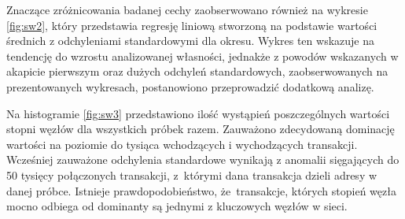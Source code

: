 \documentclass[12pt, twoside, final, openany]{mgr}
\begin{document}
\indent Znaczące zróżnicowania badanej cechy zaobserwowano również na wykresie \ref{fig:sw2}, który przedstawia regresję liniową stworzoną na podstawie wartości średnich z odchyleniami standardowymi dla okresu. Wykres ten wskazuje na tendencję do wzrostu analizowanej własności, jednakże z powodów wskazanych w akapicie pierwszym oraz dużych odchyleń standardowych, zaobserwowanych na prezentowanych wykresach, postanowiono przeprowadzić dodatkową analizę.

\indent Na histogramie \ref{fig:sw3} przedstawiono ilość wystąpień poszczególnych wartości stopni węzłów dla wszystkich próbek razem. Zauważono zdecydowaną dominację wartości na poziomie do tysiąca wchodzących i wychodzących transakcji. Wcześniej zauważone odchylenia standardowe wynikają z anomalii sięgających do 50 tysięcy połączonych transakcji, z~którymi dana transakcja dzieli adresy w danej próbce. Istnieje prawdopodobieństwo, że~transakcje, których stopień węzła mocno odbiega od dominanty są jednymi z kluczowych węzłów w sieci.
\end{document}
